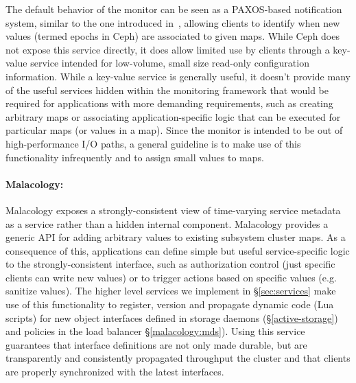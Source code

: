 \documentclass[preprint]{sigplanconf-eurosys}
\begin{document}
The default behavior of the monitor can be seen as a PAXOS-based notification
system, similar to the one introduced in~\cite{burrows_chubby_2006}, allowing
clients to identify when new values (termed epochs in Ceph) are associated to
given maps. While Ceph does not expose this service directly, it does allow
limited use by clients through a key-value service intended for low-volume,
small size read-only configuration information. While a key-value service is
generally useful, it doesn't provide many of the useful services hidden within
the monitoring framework that would be required for applications with more
demanding requirements, such as creating arbitrary maps or associating
application-specific logic that can be executed for particular maps (or values
in a map).  Since the monitor is intended to be out of high-performance I/O
paths, a general guideline is to make use of this functionality infrequently
and to assign small values to maps. 

\paragraph*{Malacology:} Malacology exposes a strongly-consistent view of
time-varying service metadata as a service rather than a hidden internal
component. Malacology provides a generic API for adding arbitrary values to
existing subsystem cluster maps. As a consequence of this, applications can
define simple but useful service-specific logic to the strongly-consistent
interface, such as authorization control (just specific clients can write new
values) or to trigger actions based on specific values (e.g. sanitize values).
The higher level services we implement in \S\ref{sec:services} make use of this
functionality to register, version and propagate dynamic code (Lua scripts) for
new object interfaces defined in storage daemons (\S\ref{active-storage}) and
policies in the load balancer \S\ref{malacology:mds}).  Using this service
guarantees that interface definitions are not only made durable, but are
transparently and consistently propagated throughput the cluster and that
clients are properly synchronized with the latest interfaces.

\end{document}
